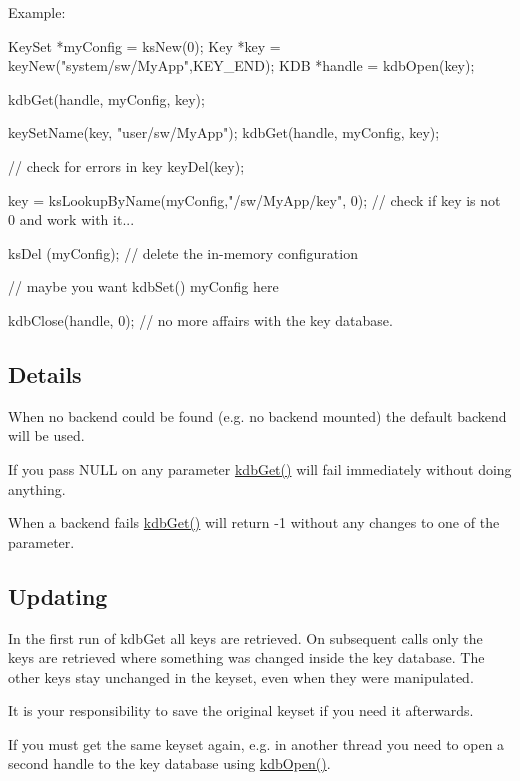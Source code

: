 \begin{DoxyParagraph}{Example:}

\begin{DoxyCode}
KeySet *myConfig = ksNew(0);
Key *key = keyNew("system/sw/MyApp",KEY_END);
KDB *handle = kdbOpen(key);

kdbGet(handle, myConfig, key);

keySetName(key, "user/sw/MyApp");
kdbGet(handle, myConfig, key);

// check for errors in key
keyDel(key);

key = ksLookupByName(myConfig,"/sw/MyApp/key", 0);
// check if key is not 0 and work with it...

ksDel (myConfig); // delete the in-memory configuration


// maybe you want kdbSet() myConfig here

kdbClose(handle, 0); // no more affairs with the key database.
\end{DoxyCode}

\end{DoxyParagraph}
\hypertarget{group__kdb_kdbgetdetail}{}\subsection{Details}\label{group__kdb_kdbgetdetail}
When no backend could be found (e.g. no backend mounted) the default backend will be used.

If you pass NULL on any parameter \hyperlink{group__kdb_ga28e385fd9cb7ccfe0b2f1ed2f62453a1}{kdbGet()} will fail immediately without doing anything.

When a backend fails \hyperlink{group__kdb_ga28e385fd9cb7ccfe0b2f1ed2f62453a1}{kdbGet()} will return -\/1 without any changes to one of the parameter.\hypertarget{group__kdb_kdbgetupdate}{}\subsection{Updating}\label{group__kdb_kdbgetupdate}
In the first run of kdbGet all keys are retrieved. On subsequent calls only the keys are retrieved where something was changed inside the key database. The other keys stay unchanged in the keyset, even when they were manipulated.

It is your responsibility to save the original keyset if you need it afterwards.

If you must get the same keyset again, e.g. in another thread you need to open a second handle to the key database using \hyperlink{group__kdb_ga6808defe5870f328dd17910aacbdc6ca}{kdbOpen()}.


